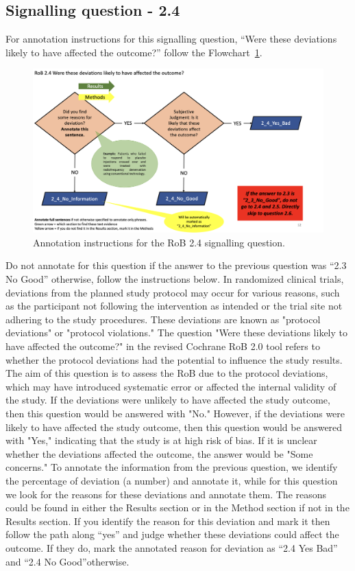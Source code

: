 \documentclass[sn-mathphys,Numbered]{sn-jnl}%
\begin{document}
\subsection*{Signalling question - 2.4 }
%
For annotation instructions for this signalling question, ``Were these deviations likely to have affected the outcome?'' follow the Flowchart~\ref{fig:2_4}.
%
\begin{figure}[hbt]
    \centering
    \includegraphics[width=\textwidth]{figures/2_4.png}
    \caption{Annotation instructions for the RoB 2.4 signalling question.}
    \label{fig:2_4}
\end{figure}
%
Do not annotate for this question if the answer to the previous question was ``2.3 No Good'' otherwise, follow the instructions below.
In randomized clinical trials, deviations from the planned study protocol may occur for various reasons, such as the participant not following the intervention as intended or the trial site not adhering to the study procedures.
These deviations are known as "protocol deviations" or "protocol violations."
The question "Were these deviations likely to have affected the outcome?" in the revised Cochrane RoB 2.0 tool refers to whether the protocol deviations had the potential to influence the study results.
The aim of this question is to assess the RoB due to the protocol deviations, which may have introduced systematic error or affected the internal validity of the study.
If the deviations were unlikely to have affected the study outcome, then this question would be answered with "No."
However, if the deviations were likely to have affected the study outcome, then this question would be answered with "Yes," indicating that the study is at high risk of bias.
If it is unclear whether the deviations affected the outcome, the answer would be "Some concerns."
To annotate the information from the previous question, we identify the percentage of deviation (a number) and annotate it, while for this question we look for the reasons for these deviations and annotate them.
The reasons could be found in either the Results section or in the Method section if not in the Results section.
If you identify the reason for this deviation and mark it then follow the path along ``yes'' and judge whether these deviations could affect the outcome.
If they do, mark the annotated reason for deviation as ``2.4 Yes Bad'' and ``2.4 No Good''otherwise.
%
%
%
\end{document}
